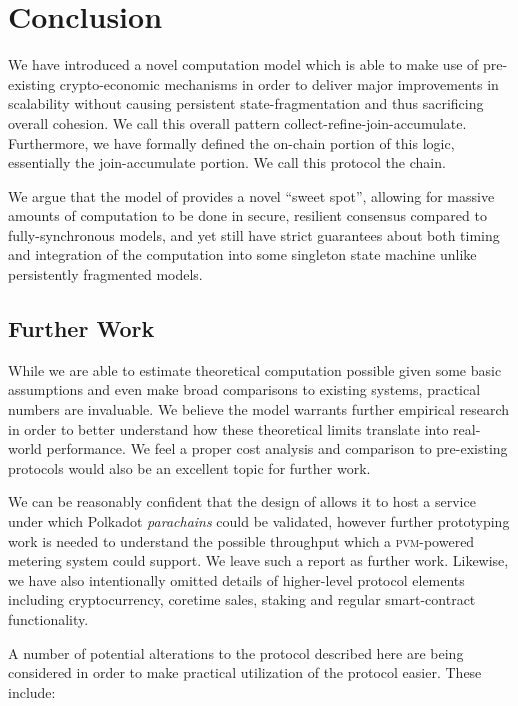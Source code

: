 \section{Conclusion}
\label{sec:conclusion}

We have introduced a novel computation model which is able to make use of pre-existing crypto-economic mechanisms in order to deliver major improvements in scalability without causing persistent state-fragmentation and thus sacrificing overall cohesion. We call this overall pattern collect-refine-join-accumulate. Furthermore, we have formally defined the on-chain portion of this logic, essentially the join-accumulate portion. We call this protocol the \Jam chain.

We argue that the model of \Jam provides a novel ``sweet spot'', allowing for massive amounts of computation to be done in secure, resilient consensus compared to fully-synchronous models, and yet still have strict guarantees about both timing and integration of the computation into some singleton state machine unlike persistently fragmented models.

\subsection{Further Work}

While we are able to estimate theoretical computation possible given some basic assumptions and even make broad comparisons to existing systems, practical numbers are invaluable. We believe the model warrants further empirical research in order to better understand how these theoretical limits translate into real-world performance. We feel a proper cost analysis and comparison to pre-existing protocols would also be an excellent topic for further work.

We can be reasonably confident that the design of \Jam allows it to host a service under which Polkadot \emph{parachains} could be validated, however further prototyping work is needed to understand the possible throughput which a \textsc{pvm}-powered metering system could support. We leave such a report as further work. Likewise, we have also intentionally omitted details of higher-level protocol elements including cryptocurrency, coretime sales, staking and regular smart-contract functionality.

A number of potential alterations to the protocol described here are being considered in order to make practical utilization of the protocol easier. These include:

